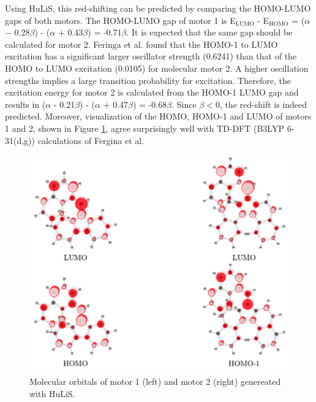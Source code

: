 \documentclass{article}
\begin{document}
Using HuLiS, this red-shifting can be predicted by comparing the HOMO-LUMO gaps of both motors. The HOMO-LUMO gap of motor 1 is E$_\text{LUMO}$ - E$_\text{HOMO}$ = ($\alpha$ − 0.28$\beta$) - ($\alpha$ + 0.43$\beta$) = -0.71$\beta$. It is expected that the same gap should be calculated for motor 2. Feringa et al. found that the HOMO-1 to LUMO excitation has a significant larger oscillator strength (0.6241) than that of the HOMO to LUMO excitation (0.0105) for molecular motor 2. A higher oscillation strengths implies a large transition probability for excitation. Therefore, the excitation energy for motor 2 is calculated from the HOMO-1 LUMO gap and results in ($\alpha$ - 0.21$\beta$) - ($\alpha$ + 0.47$\beta$) = -0.68$\beta$. Since $\beta {<} 0$, the red-shift is indeed predicted. Moreover, visualization of the HOMO, HOMO-1 and LUMO of motors 1 and 2, shown in Figure \ref{fig:hulis_orbitals}, agree surprisingly well with TD-DFT (B3LYP 6-31(d,g)) calculations of Fergina et al.

\begin{figure}[h]
\centering
\includegraphics[scale=0.75]{./images/hulis_mm.png}
\caption{Molecular orbitals of motor 1 (left) and motor 2 (right) genereated with HuLiS.}
\label{fig:hulis_orbitals}
\end{figure} 

               
    
\end{document}
